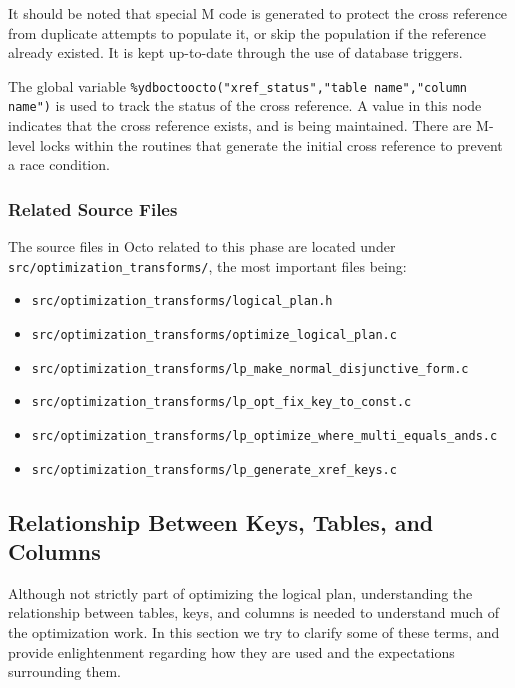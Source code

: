 \documentclass[]{article}
\def\code#1{\texttt{#1}}
\begin{document}


It should be noted that special M code is generated to protect the cross reference from duplicate attempts to populate it, or skip the population if the reference already existed.
It is kept up-to-date through the use of database triggers.

The global variable \code{\%ydboctoocto("xref\_status","table name","column name")} is used to track the status of the cross reference.
A value in this node indicates that the cross reference exists, and is being maintained.
There are M-level locks within the routines that generate the initial cross reference to prevent a race condition.

\subsubsection{Related Source Files}

The source files in Octo related to this phase are located under \code{src/optimization\_transforms/}, the most important files being:

\begin{itemize}
	\item \code{src/optimization\_transforms/logical\_plan.h}
	\item \code{src/optimization\_transforms/optimize\_logical\_plan.c}
	\item \code{src/optimization\_transforms/lp\_make\_normal\_disjunctive\_form.c}
	\item \code{src/optimization\_transforms/lp\_opt\_fix\_key\_to\_const.c}
	\item \code{src/optimization\_transforms/lp\_optimize\_where\_multi\_equals\_ands.c}
	\item \code{src/optimization\_transforms/lp\_generate\_xref\_keys.c}
\end{itemize}

\subsection{Relationship Between Keys, Tables, and Columns}

Although not strictly part of optimizing the logical plan, understanding the relationship between tables, keys, and columns is needed to understand much of the optimization work.
In this section we try to clarify some of these terms, and provide enlightenment regarding how they are used and the expectations surrounding them.
\end{document}
